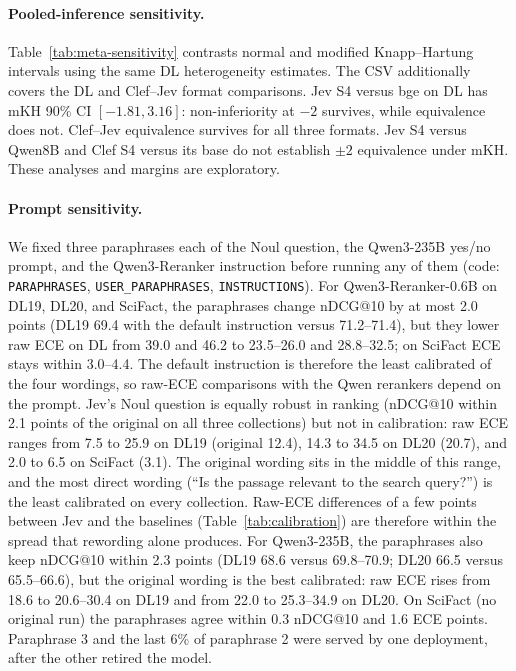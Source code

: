 \paragraph{Pooled-inference sensitivity.}
Table~\ref{tab:meta-sensitivity} contrasts normal and modified Knapp--Hartung intervals using the same DL heterogeneity estimates. The CSV additionally covers the DL and Clef--Jev format comparisons. Jev S4 versus bge on DL has mKH 90\% CI $[-1.81,3.16]$: non-inferiority at $-2$ survives, while equivalence does not. Clef--Jev equivalence survives for all three formats. Jev S4 versus Qwen8B and Clef S4 versus its base do not establish $\pm2$ equivalence under mKH. These analyses and margins are exploratory.

\paragraph{Prompt sensitivity.}\label{app:prompts}
We fixed three paraphrases each of the Noul question, the Qwen3-235B yes/no prompt, and the Qwen3-Reranker instruction before running any of them (code: \texttt{PARAPHRASES}, \texttt{USER\_PARAPHRASES}, \texttt{INSTRUCTIONS}). For Qwen3-Reranker-0.6B on DL19, DL20, and SciFact, the paraphrases change nDCG@10 by at most 2.0 points (DL19 69.4 with the default instruction versus 71.2--71.4), but they lower raw ECE on DL from 39.0 and 46.2 to 23.5--26.0 and 28.8--32.5; on SciFact ECE stays within 3.0--4.4. The default instruction is therefore the least calibrated of the four wordings, so raw-ECE comparisons with the Qwen rerankers depend on the prompt. Jev's Noul question is equally robust in ranking (nDCG@10 within 2.1 points of the original on all three collections) but not in calibration: raw ECE ranges from 7.5 to 25.9 on DL19 (original 12.4), 14.3 to 34.5 on DL20 (20.7), and 2.0 to 6.5 on SciFact (3.1). The original wording sits in the middle of this range, and the most direct wording (``Is the passage relevant to the search query?'') is the least calibrated on every collection. Raw-ECE differences of a few points between Jev and the baselines (Table~\ref{tab:calibration}) are therefore within the spread that rewording alone produces. For Qwen3-235B, the paraphrases also keep nDCG@10 within 2.3 points (DL19 68.6 versus 69.8--70.9; DL20 66.5 versus 65.5--66.6), but the original wording is the best calibrated: raw ECE rises from 18.6 to 20.6--30.4 on DL19 and from 22.0 to 25.3--34.9 on DL20. On SciFact (no original run) the paraphrases agree within 0.3 nDCG@10 and 1.6 ECE points. Paraphrase 3 and the last 6\% of paraphrase 2 were served by one deployment, after the other retired the model.

